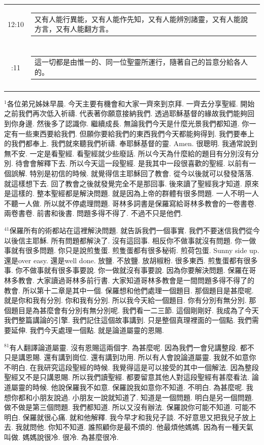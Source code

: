 \documentclass{book}
\begin{document}
\begin{longtable}{cl}
12:10 & \begin{tabularx}{0.7\textwidth}{X} 又有人能行異能，又有人能作先知，又有人能辨別諸靈，又有人能說方言，又有人能翻方言。 \end{tabularx} \\ \\ \relax
12:11 & \begin{tabularx}{0.7\textwidth}{X} 這一切都是由惟一的、同一位聖靈所運行，隨著自己的旨意分給各人的。 \end{tabularx} \\ \\
[1ex]
\hline
\hline
\end{longtable}
$^{1}$各位弟兄姊妹早晨.
今天主要有機會和大家一齊來到京拜.
一齊去分享聖經.
開始之前我們再次低入祈禱.
代表著你願意接納我們.
透過耶穌基督的緣故我們能夠回到你身邊.
然後多了認識你.
繼續成長.
無論我們今天是什麼光景我們都知道.
你一定有一些東西要給我們.
但願你要給我們的東西我們今天都能夠得到.
我們要奉上的我們都奉上.
我們就來聽我們祈禱.
奉耶穌基督的靈.
Amen.
很聰明.
我通常說到無不安.
一定是看聖經.
看聖經就少些廢話.
所以今天為什麼給的題目有分別沒有分別.
待會會解釋下去.
所以今天這一段聖經.
是我其中一段很喜歡的聖經.
以前有一個誤解.
特別是初信的時候.
就覺得信主耶穌回了教會.
從今以後就可以發發落落.
就這樣想下去.
回了教會之後就發覺完全不是那回事.
後來讀了聖經我才知道.
原來是這樣的.
整本聖經都是解決問題.
就是因為上帝的群體有很多問題.
一人不明一人不聽一人做.
所以就不停處理問題.
哥林多詞書是保羅寫給哥林多教會的一卷書卷.
兩卷書卷.
前書和後書.
問題多得不得了.
不過不只是他們.

$^{41}$保羅所有的術都站在這裡解決問題.
就告訴我們一個事實.
我們不要迷信我們從今以後信主耶穌.
所有問題都解決了.
沒有這回事.
相反你不做事就沒有問題.
你一做事就有很多問題.
你只是說煎隻蛋.
煎隻蛋都有很多秘術.
煎荷包蛋.
Sunny side up.
還是over easy.
還是well done.
放鹽.
不放鹽.
放胡椒粉.
很多東西.
煎隻蛋都有很多事.
你不做事就有很多事要說.
你一做就沒有事要說.
因為你要解決問題.
保羅在哥林多教會.
大家讀過哥林多前行書.
大家知道哥林多教會是一間問題多得不得了的教會.
所以第十二章是其中一個.
保羅想和他們處理一個題目.
那個題目是甚麼呢.
就是你和我有分別.
你和我有分別.
所以我今天給一個題目.
你有分別有無分別.
那個題目是為甚麼會有分別有無分別呢.
我們看一二三節.
這個剛剛好.
我成為了今天我們整篇講論的引擎.
我們記住這個故事講到.
只是整個真理裡面的一個點.
我們需要延伸.
我們今天處理一個點.
就是論道屬靈的恩賜.

$^{81}$有人翻譯論道屬靈.
沒有恩賜這兩個字.
為甚麼呢.
因為我們一會兒講整段.
都不只是講恩賜.
還有講到崗位.
還有講到功用.
所以有人會說論道屬靈.
我就不如意你不明白.
在我研究這段聖經的時候.
我覺得這是可以接受的其中一個解法.
因為整段聖經又不是只講恩賜.
所以我們讀聖經.
都要留意其他人對這段聖經有甚麼看法.
論道屬靈的時候.
他說保羅我不如意.
保羅說我如意你不知道.
不明白.
為甚麼呢.
我想你都和小朋友說過.
小朋友一說就知道了.
知道是一個問題.
明白是另一個問題.
做不做是第三個問題.
我們都知道.
所以又沒有辦法.
保羅說你可能不知道.
可能不明白.
保羅就很心痛.
就和他解釋.
我今早才和我兒子談.
不好意思又把我兒子放上去.
我就問他.
你知不知道.
誰照顧你是最不煩的.
他最煩他媽媽.
因為有一種天氣叫做.
媽媽說很冷.
很冷.
為甚麼很冷.
\end{document}
